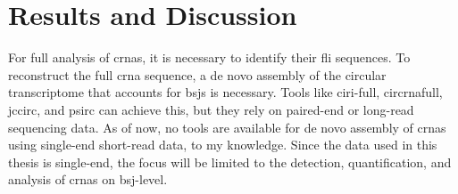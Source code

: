 \chapter{Results and Discussion}

For full analysis of \glspl{crna}, it is necessary to identify their \gls{fli}
sequences.
To reconstruct the full \gls{crna} sequence, a de novo assembly of the circular
transcriptome that accounts for \glspl{bsj} is necessary.
Tools like \gls{ciri-full}, \gls{circrnafull}, \gls{jccirc}, and \gls{psirc}
can achieve this, but they rely on paired-end or long-read sequencing data.
As of now, no tools are available for de novo assembly of \glspl{crna} using
single-end short-read data, to my knowledge.
Since the data used in this thesis is single-end, the focus will be limited to
the detection, quantification, and analysis of \glspl{crna} on \gls{bsj}-level.





